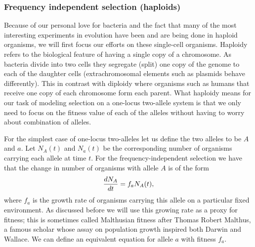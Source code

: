 \subsubsection{Frequency independent selection (haploids)}

Because of our personal love for bacteria and the fact that many of the most
interesting experiments in evolution have been and are being done in haploid
organisms, we will first focus our efforts on these single-cell organisms.
Haploidy refers to the biological feature of having a single copy of a
chromosome. As bacteria divide into two cells they segregate (split) one copy
of the genome to each of the daughter cells (extrachromosomal elements such as
plasmids behave differently). This in contrast with diploidy where organisms
such as humans that receive one copy of each chromosome form each parent. What
haploidy means for our task of modeling selection on a one-locus two-allele
system is that we only need to focus on the fitness value of each of the
alleles without having to worry about combination of alleles.

For the simplest case of one-locus two-alleles let us define the two alleles to
be $A$ and $a$. Let $N_A(t)$ and $N_a(t)$ be the corresponding number of
organisms carrying each allele at time $t$. For the frequency-independent 
selection we have that the change in number of organisms with allele $A$ is of
the form
\begin{equation}
  {d{N_A} \over dt} = f_a N_A(t),
\end{equation}
where $f_a$ is the growth rate of organisms carrying this allele on a
particular fixed environment. As discussed before we will use this growing rate
as a proxy for fitness; this is sometimes called Malthusian fitness after
Thomas Robert Malthus, a famous scholar whose assay on population growth
inspired both Darwin and Wallace. We can define an equivalent equation for
allele $a$ with fitness $f_a$.


